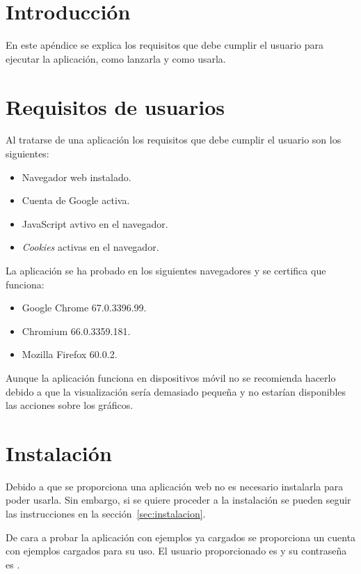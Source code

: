 
\section{Introducción}

En este apéndice se explica los requisitos que debe cumplir el usuario para 
ejecutar la aplicación, como lanzarla y como usarla.

\section{Requisitos de usuarios}

Al tratarse de una aplicación los requisitos que debe cumplir el usuario son 
los siguientes:
\begin{itemize}
	\tightlist
	\item Navegador web instalado.
	\item Cuenta de Google activa.
	\item JavaScript avtivo en el navegador.
	\item \textit{Cookies} activas en el navegador.
\end{itemize}

La aplicación se ha probado en los siguientes navegadores y se certifica que 
funciona:
\begin{itemize}
	\tightlist
	\item Google Chrome 67.0.3396.99.
	\item Chromium 66.0.3359.181.
	\item Mozilla Firefox 60.0.2.
\end{itemize}

Aunque la aplicación funciona en dispositivos móvil no se recomienda hacerlo 
debido a que la visualización sería demasiado pequeña y no estarían disponibles 
las acciones sobre los gráficos.

\section{Instalación}

Debido a que se proporciona una aplicación web no es necesario instalarla para 
poder usarla. Sin embargo, si se quiere proceder a la instalación se pueden 
seguir las instrucciones en la sección~\ref{sec:instalacion}.

De cara a probar la aplicación con ejemplos ya cargados se proporciona un 
cuenta con ejemplos cargados para su uso. El usuario proporcionado es  
 y su contraseña es 
.

